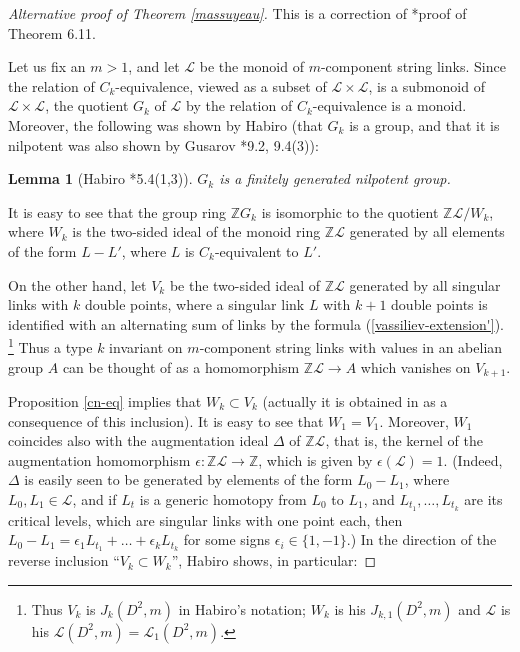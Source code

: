 \documentclass[a4paper,12pt,reqno,oneside]{amsart} %
\theoremstyle{plain}
\newtheorem{lemma}[theorem]{Lemma}
\theoremstyle{definition}
\theoremstyle{named}
\def\x{\times}
\renewcommand{\:}{\colon}
\def\Z{\mathbb{Z}}
\def\L{\mathcal{L}}
\begin{document}
\begin{proof}[Alternative proof of Theorem \ref{massuyeau}] This is a correction of \cite{Hab}*{proof of Theorem 6.11}.

Let us fix an $m>1$, and let $\L$ be the monoid of $m$-component string links.
Since the relation of $C_k$-equivalence, viewed as a subset of $\L\x\L$, is a submonoid of $\L\x\L$, 
the quotient $G_k$ of $\L$ by the relation of $C_k$-equivalence is a monoid.
Moreover, the following was shown by Habiro (that $G_k$ is a group, and that it is nilpotent was also 
shown by Gusarov \cite{Gu2}*{9.2, 9.4(3)}):

\begin{lemma}[Habiro \cite{Hab}*{5.4(1,3)}] \label{fg-nilpotent} $G_k$ is a finitely generated nilpotent group.
\end{lemma}

It is easy to see that the group ring $\Z G_k$ is isomorphic to the quotient $\Z\L/W_k$, where $W_k$ is 
the two-sided ideal of the monoid ring $\Z\L$ generated by all elements of the form $L-L'$, where $L$ 
is $C_k$-equivalent to $L'$.

On the other hand, let $V_k$ be the two-sided ideal of $\Z\L$ generated by all singular links with $k$ double points, where a singular link $L$
with $k+1$ double points is identified with an alternating sum of links by the formula (\ref{vassiliev-extension'}).%
\footnote{Thus $V_k$ is $J_k(D^2,m)$ in Habiro's notation; $W_k$ is his $J_{k,1}(D^2,m)$ and $\L$ is his $\L(D^2,m)=\L_1(D^2,m)$.}
Thus a type $k$ invariant on $m$-component string links with values in an abelian group $A$ can be thought of as a homomorphism
$\Z\L\to A$ which vanishes on $V_{k+1}$.

Proposition \ref{cn-eq} implies that $W_k\subset V_k$ (actually it is obtained in \cite{Hab} as a consequence of this inclusion).
It is easy to see that $W_1=V_1$.
Moreover, $W_1$ coincides also with the augmentation ideal $\Delta$ of $\Z\L$, that is, the kernel of the augmentation homomorphism 
$\epsilon\:\Z\L\to\Z$, which is given by $\epsilon(\L)=1$.
(Indeed, $\Delta$ is easily seen to be generated by elements of the form $L_0-L_1$, where $L_0,L_1\in\L$, and if $L_t$ is 
a generic homotopy from $L_0$ to $L_1$, and $L_{t_1},\dots,L_{t_k}$ are its critical levels, which are singular links
with one point each, then $L_0-L_1=\epsilon_1L_{t_1}+\dots+\epsilon_kL_{t_k}$ for some signs $\epsilon_i\in\{1,-1\}$.)
In the direction of the reverse inclusion ``$V_k\subset W_k$'', Habiro shows, in particular:


\end{proof}
\end{document}
